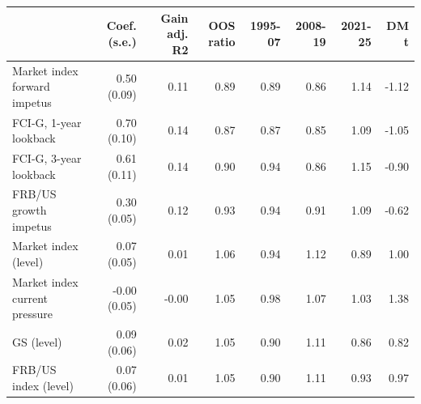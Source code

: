\begin{tabular}{lrrrrrrr}
\toprule
 & Coef. (s.e.) & Gain adj. R2 & OOS ratio & 1995-07 & 2008-19 & 2021-25 & DM t \\
\midrule
Market index forward impetus & 0.50 (0.09) & 0.11 & 0.89 & 0.89 & 0.86 & 1.14 & -1.12 \\
FCI-G, 1-year lookback & 0.70 (0.10) & 0.14 & 0.87 & 0.87 & 0.85 & 1.09 & -1.05 \\
FCI-G, 3-year lookback & 0.61 (0.11) & 0.14 & 0.90 & 0.94 & 0.86 & 1.15 & -0.90 \\
FRB/US growth impetus & 0.30 (0.05) & 0.12 & 0.93 & 0.94 & 0.91 & 1.09 & -0.62 \\
Market index (level) & 0.07 (0.05) & 0.01 & 1.06 & 0.94 & 1.12 & 0.89 & 1.00 \\
Market index current pressure & -0.00 (0.05) & -0.00 & 1.05 & 0.98 & 1.07 & 1.03 & 1.38 \\
GS (level) & 0.09 (0.06) & 0.02 & 1.05 & 0.90 & 1.11 & 0.86 & 0.82 \\
FRB/US index (level) & 0.07 (0.06) & 0.01 & 1.05 & 0.90 & 1.11 & 0.93 & 0.97 \\
\bottomrule
\end{tabular}
